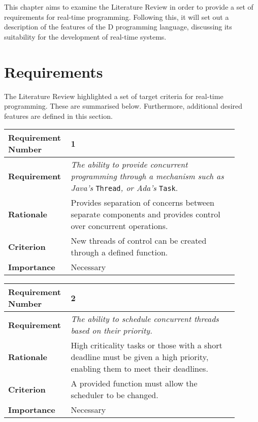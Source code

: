 
This chapter aims to examine the Literature Review in order to provide a set of 
requirements for real-time programming. Following this, it will set out a 
description of the features of the D programming language, discussing its 
suitability for the development of real-time systems.

\section{Requirements}
The Literature Review highlighted a set of target criteria for real-time 
programming. These are summarised below. Furthermore, additional desired features 
are defined in this section. 
\begin{table}[!h]
\centering
\begin{tabular}{|L{0.2\linewidth}|L{0.7\linewidth}|}
\hline
\textbf{Requirement Number} & 1 \\ \hline
\textbf{Requirement} & \emph{The ability to provide concurrent programming through a 
mechanism such as Java's} \texttt{Thread}\emph{, or Ada's} \texttt{Task}. \\ \hline
\textbf{Rationale}      & Provides separation of concerns between separate components
and provides control over concurrent operations. \\ \hline
\textbf{Criterion}      & New threads of control can be created through a defined 
function. \\ \hline
\textbf{Importance}     & Necessary \\ \hline
\end{tabular}
\end{table}
\begin{table}[!h]
\centering
\begin{tabular}{|L{0.2\linewidth}|L{0.7\linewidth}|}
\hline
\textbf{Requirement Number} & 2 \\ \hline
\textbf{Requirement} & \emph{The ability to schedule concurrent threads based on 
                their priority.}\\ \hline
\textbf{Rationale}      & High criticality tasks or those with a short deadline
                must be given a high priority, enabling them to meet their 
                deadlines. \\ \hline
\textbf{Criterion}      & A provided function must allow the scheduler to be changed. \\ \hline
\textbf{Importance}     & Necessary \\ \hline
\end{tabular}
\end{table}
